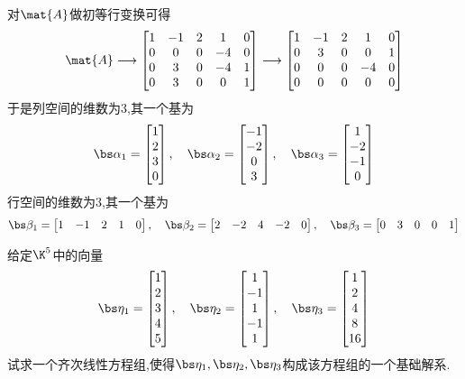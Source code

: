 \documentclass{ctexart}
\begin{document}
\begin{solution}
    对$\mat{A}$做初等行变换可得
    \[\mat{A}\longrightarrow\begin{bmatrix}
        1&-1&2&1&0\\
        0&0&0&-4&0\\
        0&3&0&-4&1\\
        0&3&0&0&1
    \end{bmatrix}\longrightarrow\begin{bmatrix}
        1&-1&2&1&0\\
        0&3&0&0&1\\
        0&0&0&-4&0\\
        0&0&0&0&0
    \end{bmatrix}\]
    于是列空间的维数为$3$,其一个基为
    \[\bs\alpha_1=\begin{bmatrix}
        1\\2\\3\\0
    \end{bmatrix},\quad\bs\alpha_2=\begin{bmatrix}
        -1\\-2\\0\\3
    \end{bmatrix},\quad\bs\alpha_3=\begin{bmatrix}
        1\\-2\\-1\\0
    \end{bmatrix}\]
    行空间的维数为$3$,其一个基为
    \[\bs\beta_1=\begin{bmatrix}
        1&-1&2&1&0
    \end{bmatrix},\quad\bs\beta_2=\begin{bmatrix}
        2&-2&4&-2&0
    \end{bmatrix},\quad\bs\beta_3=\begin{bmatrix}
        0&3&0&0&1
    \end{bmatrix}\]
\end{solution}
\begin{homework}[3(20')]
    给定$\K^5$中的向量
    \[\bs\eta_1=\begin{bmatrix}
        1\\2\\3\\4\\5
    \end{bmatrix},\quad\bs\eta_2=\begin{bmatrix}
        1\\-1\\1\\-1\\1
    \end{bmatrix},\quad\bs\eta_3=\begin{bmatrix}
        1\\2\\4\\8\\16
    \end{bmatrix}\]
    试求一个齐次线性方程组,使得$\bs\eta_1,\bs\eta_2,\bs\eta_3$构成该方程组的一个基础解系.
\end{homework}
\end{document}
